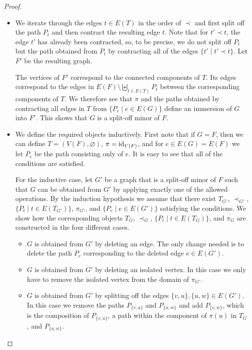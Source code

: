 \documentclass[11pt]{article}
\begin{document}
\begin{proof}\ 
    \begin{itemize}
        \item[(ii)$\Rightarrow$(i)]
            We iterate through the edges $t \in E(T)$ in the order of $\prec$ and first split off the path $P_t$ and then contract the resulting edge $t$. Note that for $t'\prec t$, the edge $t'$ has already been contracted, so, to be precise, we do not split off $P_t$ but the path obtained from $P_t$ by contracting all of the edges $\{t' \mid t'\prec t\}$. Let $F'$ be the resulting graph.
            \par 
            The vertices of $F'$ correspond to the connected components of $T$. Its edges correspond to the edges in $E(F) \setminus \biguplus_{t\in E(T)} P_t$ between the corresponding components of $T$.
            We therefore see that $\pi$ and the paths obtained by contracting all edges in $T$ from $\{P_e \mid e \in E(G)\}$ define an immersion of $G$ into $F'$.
            This shows that $G$ is a split-off minor of $F$.

        \item[(i)$\Rightarrow$(ii)] 
        We define the required objects inductively. 
        First note that if $G = F$, then we can define $T = (V(F), \varnothing)$, $\pi = \operatorname{id}_{V(F)}$, and for $e \in E(G) = E(F)$ we let $P_e$ be the path consisting only of $e$. It is easy to see that all of the conditions are satisfied.\par 
        For the inductive case, let $G'$ be a graph that is a split-off minor of $F$ such that $G$ can be obtained from $G'$ by applying exactly one of the allowed operations. 
        By the induction hypothesis we assume that there exist $T_{G'}$, $\prec_{G'}$, $\{P_t \mid t \in E(T_{G'})\}$, $\pi_{G'}$, and $\{P_e \mid e \in E(G')\}$ satisfying the conditions. 
        We show how the corresponding objects $T_{G}$, $\prec_G$, $\{P_t \mid t \in E(T_{G})\}$, and $\pi_{G}$ are constructed in the four different cases.
        \begin{itemize}
            \item $G$ is obtained from $G'$ by deleting an edge. 
            The only change needed is to delete the path $P_e$ corresponding to the deleted edge $e \in E(G')$.
            \item $G$ is obtained from $G'$ by deleting an isolated vertex. In this case we only have to remove the isolated vertex from the domain of $\pi_{G'}$.

            \item $G$ is obtained from $G'$ by splitting off the edges $\{v,u\}, \{u,w\} \in E(G')$. In this case we remove the paths $P_{\{v,u\}}$ and $P_{\{u,w\}}$ and add $P_{\{v,w\}}$, which is the composition of $P_{\{v,u\}}$, a path within the component of $\pi(u)$ in $T_G$, and $P_{\{u,w\}}$.


\end{itemize}
\end{itemize}
\end{proof}
\end{document}
